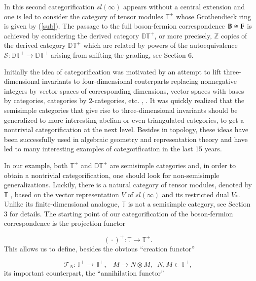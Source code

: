 \documentclass[11pt]{amsart}
\newcommand {\ZZ} {\mathbb {Z}}
\begin{document}
In this second categorification $sl(\infty)$  appears without a central extension and one is led to 
consider the category of tensor modules $\mathbb{T}^+$ whose Grothendieck ring is given by (\ref{sub}). 
The passage to the full boson-fermion correspondence $\bold{B} \cong \bold{F}$ is achieved by considering the 
derived category $\mathbb{DT}^+$, or more precisely, $\ZZ$ copies of the derived category  $\mathbb{DT}^+$ which are related by powers of the autoequivalence
$\mathcal S: \mathbb{DT}^+\to \mathbb{DT}^+$ arising from shifting the grading, see Section 6.

Initially the idea of categorification was motivated by an attempt to lift three-dimensional 
invariants to four-dimensional couterparts replacing nonnegative integers by vector spaces of corresponding 
dimensions, vector spaces with bases by categories, categories by $2$-categories, etc. \cite{CF}, \cite{K1}.
It was quickly realized that the semisimple categories that give rise to three-dimensional invariants should be
generalized to more interesting abelian or even triangulated categories, to get a nontrivial categorification 
at the next level. Besides in topology, these ideas have been successfully used in algebraic geometry and 
representation theory and have led to many interesting examples of categorification in the last 15 years.

In our example, both $\mathbb{T}^+$ and $\mathbb{DT}^+$ are semisimple categories and, in order to obtain
a nontrivial categorification, one should look for non-semisimple generalizations. Luckily, there is a 
natural category of tensor modules, denoted by $\mathbb{T}$ \cite{DPS}, based on the vector representation 
$V$ of $sl(\infty)$ and its restricted dual $V_*$. Unlike its finite-dimensional analogue, $\mathbb{T}$ is not a
semisimple category, see Section $3$ for details. The starting point of our categorification of the boson-fermion 
correspondence is the projection functor

\begin{equation}\label{projfunct}
 (\mbox{} \cdot \mbox{})^+:\mathbb{T}\rightarrow \mathbb{T}^+.\nonumber
\end{equation}
This allows us to define, besides the obvious ``creation functor''

\begin{equation}\label{funct}
 \mathcal{T}_N : \mathbb{T}^+ \rightarrow \mathbb{T}^+, \;\;\; M \rightarrow N \otimes M,\;\; N,M \in \mathbb{T}^+,\nonumber
\end{equation}
its important counterpart, the ``annihilation functor''
\end{document}
